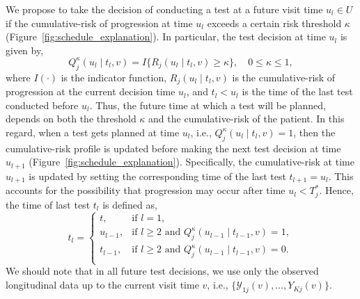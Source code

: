 \documentclass[useAMS, usenatbib, referee]{biom}
\begin{document}
We propose to take the decision of conducting a test at a future visit time $u_l \in U$ if the cumulative-risk of progression at time $u_l$ exceeds a certain risk threshold $\kappa$ (Figure~\ref{fig:schedule_explanation}). In particular, the test decision at time $u_l$ is given by,
\begin{equation}
\label{eq:personalized_decision_grid}
Q_j^\kappa (u_l \mid t_l, v) = I \big \{ R_j(u_l \mid t_l, v) \geq \kappa \big\}, \quad 0 \leq \kappa \leq 1,
\end{equation}
where $I(\cdot)$ is the indicator function, $R_j(u_l \mid t_l, v)$ is the cumulative-risk of progression at the current decision time $u_l$, and $t_l < u_l$ is the time of the last test conducted before $u_l$. Thus, the future time at which a test will be planned, depends on both the threshold $\kappa$ and the cumulative-risk of the patient. In this regard, when a test gets planned at time $u_l$, i.e., $Q_j^\kappa (u_l \mid t_l, v) = 1$, then the cumulative-risk profile is updated before making the next test decision at time $u_{l+1}$ (Figure~\ref{fig:schedule_explanation}). Specifically, the cumulative-risk at time $u_{l+1}$ is updated by setting the corresponding time of the last test $t_{l+1}=u_l$. This accounts for the possibility that progression may occur after time $u_l < T^*_j$. Hence, the time of last test $t_l$ is defined as,
\begin{equation*}
t_l = \left \{ 
\begin{array}{ll}
t, & \mbox{if } l = 1,\\
u_{l-1}, & \mbox{if } l \geq 2 \mbox{ and } Q_j^\kappa (u_{l-1} \mid t_{l-1}, v) = 1,\\
t_{l-1}, & \mbox{if } l \geq 2 \mbox{ and } Q_j^\kappa (u_{l-1} \mid t_{l-1}, v) = 0.\\
\end{array}
\right.
\end{equation*}
We should note that in all future test decisions, we use only the observed longitudinal data up to the current visit time $v$, i.e., $\{\mathcal Y_{1j}(v), \ldots, Y_{Kj}(v)\}$.
\end{document}
